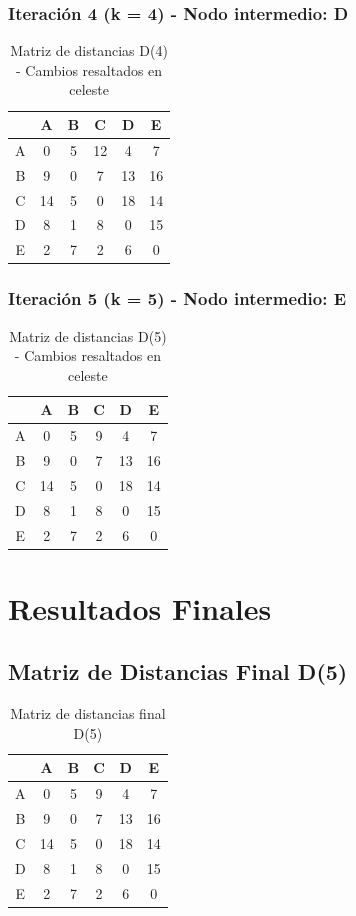 \documentclass[12pt]{article}
\begin{document}
\subsubsection{Iteración 4 (k = 4) - Nodo intermedio: D}
\begin{table}[h!]
\centering
\begin{tabular}{|c|c|c|c|c|c|}
\hline
 & A & B & C & D & E \\\hline
A & 0 & \cellcolor{lightgreen} 5 & \cellcolor{lightgreen} 12 & 4 & 7 \\\hline
B & 9 & 0 & 7 & 13 & 16 \\\hline
C & 14 & 5 & 0 & 18 & 14 \\\hline
D & 8 & 1 & 8 & 0 & 15 \\\hline
E & 2 & 7 & 2 & 6 & 0 \\\hline
\end{tabular}
\caption{Matriz de distancias D(4) - Cambios resaltados en celeste}
\end{table}

\subsubsection{Iteración 5 (k = 5) - Nodo intermedio: E}
\begin{table}[h!]
\centering
\begin{tabular}{|c|c|c|c|c|c|}
\hline
 & A & B & C & D & E \\\hline
A & 0 & 5 & \cellcolor{lightgreen} 9 & 4 & 7 \\\hline
B & 9 & 0 & 7 & 13 & 16 \\\hline
C & 14 & 5 & 0 & 18 & 14 \\\hline
D & 8 & 1 & 8 & 0 & 15 \\\hline
E & 2 & 7 & 2 & 6 & 0 \\\hline
\end{tabular}
\caption{Matriz de distancias D(5) - Cambios resaltados en celeste}
\end{table}

\clearpage
\section{Resultados Finales}
\subsection{Matriz de Distancias Final D(5)}
\begin{table}[h!]
\centering
\begin{tabular}{|c|c|c|c|c|c|}
\hline
 & A & B & C & D & E \\\hline
A & 0 & 5 & 9 & 4 & 7 \\\hline
B & 9 & 0 & 7 & 13 & 16 \\\hline
C & 14 & 5 & 0 & 18 & 14 \\\hline
D & 8 & 1 & 8 & 0 & 15 \\\hline
E & 2 & 7 & 2 & 6 & 0 \\\hline
\end{tabular}
\caption{Matriz de distancias final D(5)}
\end{table}
\end{document}
